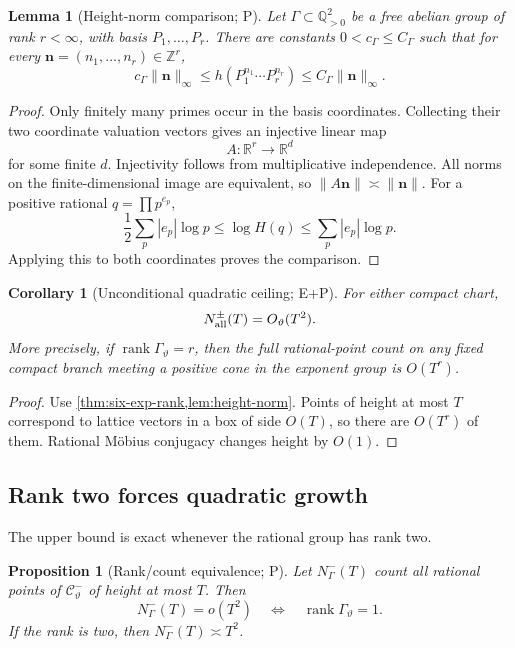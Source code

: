 \documentclass[10pt,oneside]{article}
\newtheorem{proposition}[theorem]{Proposition}
\newtheorem{lemma}[theorem]{Lemma}
\newtheorem{corollary}[theorem]{Corollary}
\theoremstyle{definition}
\theoremstyle{remark}
\newcommand{\Z}{\mathbb Z}
\newcommand{\Q}{\mathbb Q}
\newcommand{\R}{\mathbb R}
\newcommand{\thetaq}{\vartheta}
\newcommand{\rec}{\mathcal C^-_{\thetaq}}
\newcommand{\rank}{\operatorname{rank}}
\newcommand{\statusP}{\textsc{P}}
\newcommand{\statusE}{\textsc{E}}
\begin{document}
\begin{lemma}[Height-norm comparison; \statusP]
\label{lem:height-norm}
Let \(\Gamma\subset\Q_{>0}^2\) be a free abelian group of rank \(r<\infty\), with basis \(P_1,\ldots,P_r\).  There are constants \(0<c_\Gamma\le C_\Gamma\) such that for every \(\bm n=(n_1,\ldots,n_r)\in\Z^r\),
\[
 c_\Gamma\|\bm n\|_\infty
 \le h(P_1^{n_1}\cdots P_r^{n_r})
 \le C_\Gamma\|\bm n\|_\infty.
\]
\end{lemma}

\begin{proof}
Only finitely many primes occur in the basis coordinates.  Collecting their two coordinate valuation vectors gives an injective linear map
\[
 A:\R^r\longrightarrow\R^d
\]
for some finite \(d\).  Injectivity follows from multiplicative independence.  All norms on the finite-dimensional image are equivalent, so \(\|A\bm n\|\asymp\|\bm n\|\).  For a positive rational \(q=\prod p^{e_p}\),
\[
 \frac12\sum_p|e_p|\log p
 \le\log H(q)\le
 \sum_p|e_p|\log p.
\]
Applying this to both coordinates proves the comparison.
\end{proof}

\begin{corollary}[Unconditional quadratic ceiling; \statusE+\statusP]
\label{cor:quadratic-ceiling}
For either compact chart,
\[
 N_{\rm all}^{\pm}(T)=O_{\thetaq}(T^2).
\]
More precisely, if \(\rank\Gamma_{\thetaq}=r\), then the full rational-point count on any fixed compact branch meeting a positive cone in the exponent group is \(O(T^r)\).
\end{corollary}

\begin{proof}
Use \cref{thm:six-exp-rank,lem:height-norm}.  Points of height at most \(T\) correspond to lattice vectors in a box of side \(O(T)\), so there are \(O(T^r)\) of them.  Rational Möbius conjugacy changes height by \(O(1)\).
\end{proof}

\subsection{Rank two forces quadratic growth}
The upper bound is exact whenever the rational group has rank two.

\begin{proposition}[Rank/count equivalence; \statusP]
\label{prop:rank-count}
Let \(N_{\Gamma}^{-}(T)\) count all rational points of \(\rec\) of height at most \(T\).  Then
\[
 N_{\Gamma}^{-}(T)=o(T^2)
 \quad\Longleftrightarrow\quad
 \rank\Gamma_{\thetaq}=1.
\]
If the rank is two, then \(N_{\Gamma}^{-}(T)\asymp T^2\).
\end{proposition}
\end{document}
